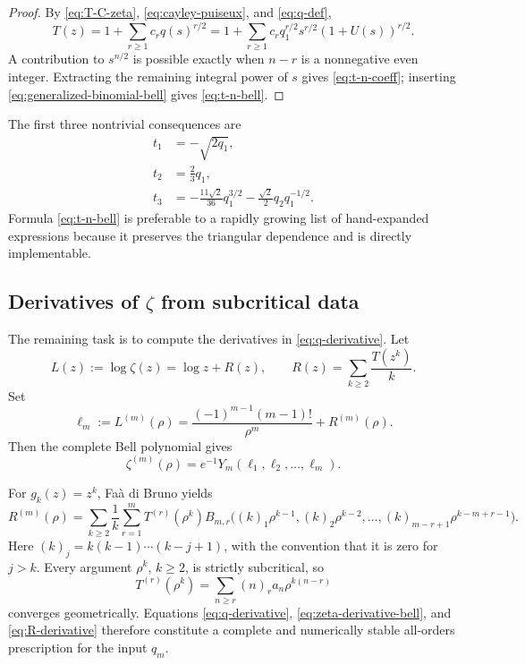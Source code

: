 \documentclass[11pt,oneside]{article}
\numberwithin{equation}{section}
\theoremstyle{plain}
\theoremstyle{definition}
\theoremstyle{remark}
\newcommand{\fall}[2]{(#1)_{#2}}
\begin{document}
\begin{proof}
By \eqref{eq:T-C-zeta}, \eqref{eq:cayley-puiseux}, and
\eqref{eq:q-def},
\[
 T(z)=1+\sum_{r\ge1}c_rq(s)^{r/2}
 =1+\sum_{r\ge1}c_rq_1^{r/2}s^{r/2}(1+U(s))^{r/2}.
\]
A contribution to $s^{n/2}$ is possible exactly when $n-r$ is a
nonnegative even integer.  Extracting the remaining integral power of $s$
gives \eqref{eq:t-n-coeff}; inserting
\eqref{eq:generalized-binomial-bell} gives \eqref{eq:t-n-bell}.
\end{proof}

The first three nontrivial consequences are
\begin{align}
 t_1&=-\sqrt{2q_1},\label{eq:t1}\\
 t_2&=\frac23q_1,\label{eq:t2}\\
 t_3&=-\frac{11\sqrt2}{36}q_1^{3/2}
      -\frac{\sqrt2}{2}q_2q_1^{-1/2}.
\label{eq:t3}
\end{align}
Formula \eqref{eq:t-n-bell} is preferable to a rapidly growing list of
hand-expanded expressions because it preserves the triangular dependence and
is directly implementable.

\subsection{Derivatives of $\zeta$ from subcritical data}

The remaining task is to compute the derivatives in
\eqref{eq:q-derivative}.  Let
\begin{equation}\label{eq:L-def}
 L(z):=\log\zeta(z)=\log z+R(z),\qquad
 R(z)=\sum_{k\ge2}\frac{T(z^k)}k.
\end{equation}
Set
\begin{equation}\label{eq:ell-m-def}
 \ell_m:=L^{(m)}(\rho)
 =\frac{(-1)^{m-1}(m-1)!}{\rho^m}+R^{(m)}(\rho).
\end{equation}
Then the complete Bell polynomial gives
\begin{equation}\label{eq:zeta-derivative-bell}
 \boxed{
 \zeta^{(m)}(\rho)=e^{-1}Y_m(\ell_1,\ell_2,\ldots,\ell_m).}
\end{equation}

For $g_k(z)=z^k$, Fa\`a di Bruno yields
\begin{equation}\label{eq:R-derivative}
 \boxed{
 R^{(m)}(\rho)=
 \sum_{k\ge2}\frac1k\sum_{r=1}^{m}
 T^{(r)}(\rho^k)
 B_{m,r}\bigl(\fall{k}{1}\rho^{k-1},
               \fall{k}{2}\rho^{k-2},\ldots,
               \fall{k}{m-r+1}\rho^{k-m+r-1}\bigr).}
\end{equation}
Here $\fall{k}{j}=k(k-1)\cdots(k-j+1)$, with the convention that it is
zero for $j>k$.  Every argument $\rho^k$, $k\ge2$, is strictly subcritical,
so
\begin{equation}\label{eq:T-derivative-subcritical}
 T^{(r)}(\rho^k)=\sum_{n\ge r}\fall{n}{r}a_n\rho^{k(n-r)}
\end{equation}
converges geometrically.  Equations
\eqref{eq:q-derivative}, \eqref{eq:zeta-derivative-bell}, and
\eqref{eq:R-derivative} therefore constitute a complete and numerically
stable all-orders prescription for the input $q_m$.
\end{document}
